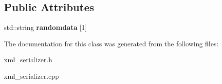 \subsection*{Public Attributes}
\begin{DoxyCompactItemize}
\item 
std\+::string {\bfseries randomdata} \mbox{[}1\mbox{]}\hypertarget{classXMLSerializer_ac7af764be273fadedb909d087e6fb47b}{}\label{classXMLSerializer_ac7af764be273fadedb909d087e6fb47b}

\end{DoxyCompactItemize}


The documentation for this class was generated from the following files\+:\begin{DoxyCompactItemize}
\item 
xml\+\_\+serializer.\+h\item 
xml\+\_\+serializer.\+cpp\end{DoxyCompactItemize}
